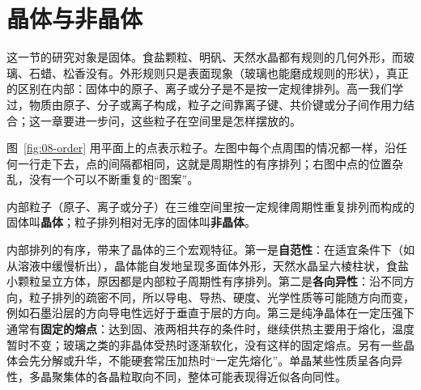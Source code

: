 \section{晶体与非晶体}

这一节的研究对象是固体。食盐颗粒、明矾、天然水晶都有规则的几何外形，而玻璃、石蜡、松香没有。外形规则只是表面现象（玻璃也能磨成规则的形状），真正的区别在内部：固体中的原子、离子或分子是不是按一定规律排列。高一我们学过，物质由原子、分子或离子构成，粒子之间靠离子键、共价键或分子间作用力结合；这一章要进一步问，这些粒子在空间里是怎样摆放的。

图~\ref{fig:08-order} 用平面上的点表示粒子。左图中每个点周围的情况都一样，沿任何一行走下去，点的间隔都相同，这就是周期性的有序排列；右图中点的位置杂乱，没有一个可以不断重复的“图案”。


\begin{gainian}[晶体与非晶体]
内部粒子（原子、离子或分子）在三维空间里按一定规律周期性重复排列而构成的固体叫\textbf{晶体}；粒子排列相对无序的固体叫\textbf{非晶体}。
\end{gainian}

内部排列的有序，带来了晶体的三个宏观特征。第一是\textbf{自范性}：在适宜条件下（如从溶液中缓慢析出），晶体能自发地呈现多面体外形，天然水晶呈六棱柱状，食盐小颗粒呈立方体，原因都是内部粒子周期性有序排列。第二是\textbf{各向异性}：沿不同方向，粒子排列的疏密不同，所以导电、导热、硬度、光学性质等可能随方向而变，例如石墨沿层的方向导电性远好于垂直于层的方向。第三是纯净晶体在一定压强下通常有\textbf{固定的熔点}：达到固、液两相共存的条件时，继续供热主要用于熔化，温度暂时不变；玻璃之类的非晶体受热时逐渐软化，没有这样的固定熔点。另有一些晶体会先分解或升华，不能硬套常压加热时“一定先熔化”。单晶某些性质呈各向异性，多晶聚集体的各晶粒取向不同，整体可能表现得近似各向同性。


